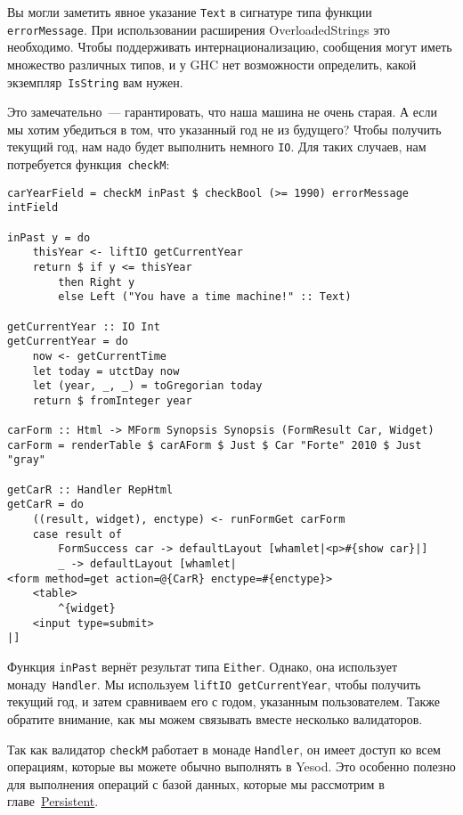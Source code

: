 \begin{remark}
Вы могли заметить явное указание \lstinline'Text' в сигнатуре типа функции
\lstinline'errorMessage'. При использовании расширения OverloadedStrings это
необходимо. Чтобы поддерживать интернационализацию, сообщения могут иметь
множество различных типов, и у GHC нет возможности определить, какой
экземпляр~\lstinline'IsString' вам нужен.
\end{remark}

Это замечательно~--- гарантировать, что наша машина не очень старая. А если мы
хотим убедиться в том, что указанный год не из будущего? Чтобы получить
текущий год, нам надо будет выполнить немного \lstinline'IO'. Для таких
случаев, нам потребуется функция~\lstinline'checkM':

\begin{lstlisting}
carYearField = checkM inPast $ checkBool (>= 1990) errorMessage intField

inPast y = do
    thisYear <- liftIO getCurrentYear
    return $ if y <= thisYear
        then Right y
        else Left ("You have a time machine!" :: Text)

getCurrentYear :: IO Int
getCurrentYear = do
    now <- getCurrentTime
    let today = utctDay now
    let (year, _, _) = toGregorian today
    return $ fromInteger year

carForm :: Html -> MForm Synopsis Synopsis (FormResult Car, Widget)
carForm = renderTable $ carAForm $ Just $ Car "Forte" 2010 $ Just "gray"

getCarR :: Handler RepHtml
getCarR = do
    ((result, widget), enctype) <- runFormGet carForm
    case result of
        FormSuccess car -> defaultLayout [whamlet|<p>#{show car}|]
        _ -> defaultLayout [whamlet|
<form method=get action=@{CarR} enctype=#{enctype}>
    <table>
        ^{widget}
    <input type=submit>
|]
\end{lstlisting}

Функция \lstinline'inPast' вернёт результат типа \lstinline'Either'. Однако,
она использует монаду~\lstinline'Handler'. Мы используем \lstinline'liftIO getCurrentYear',
чтобы получить текущий год, и затем сравниваем его с годом, указанным
пользователем. Также обратите внимание, как мы можем связывать вместе
несколько валидаторов.

\begin{remark}
Так как валидатор \lstinline'checkM' работает в монаде \lstinline'Handler', он
имеет доступ ко всем операциям, которые вы можете обычно выполнять в Yesod.
Это особенно полезно для выполнения операций с базой данных, которые мы
рассмотрим в главе~\hyperref[chap:persistent]{Persistent}.
\end{remark}

